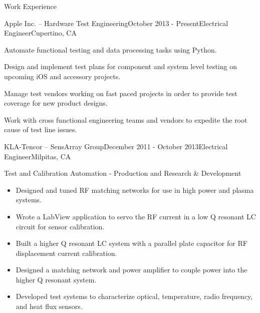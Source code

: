 \documentclass{resume} %
\begin{document}
\begin{rSection}{Work Experience}
\vspace{-0.5em}
\begin{rSubsection}{Apple Inc. -- Hardware Test Engineering}{October 2013 - Present}{Electrical Engineer}{Cupertino, CA}
\item Automate functional testing and data processing tasks using Python.
\item Design and implement test plans for component and system level testing on upcoming iOS and accessory projects.
\item Manage test vendors working on fast paced projects in order to provide test coverage for new product designs.
\item Work with cross functional engineering teams and vendors to expedite the root cause of test line issues.
\end{rSubsection}


\ssquish
\begin{rSubsection2}{KLA-Tencor -- SensArray Group}{December 2011 - October 2013}{Electrical Engineer}{Milpitas, CA}
\item Test and Calibration Automation - Production and Research \& Development
\begin{itemize}
\itemsep -0.5em \vspace{-0.5em}
\renewcommand{\labelitemi}{-}
\item Designed and tuned RF matching networks for use in high power and plasma systems.
\item Wrote a LabView application to servo the RF current in a low Q resonant LC circuit for sensor calibration.
\item Built a higher Q resonant LC system with a parallel plate capacitor for RF displacement current calibration.
\item Designed a matching network and power amplifier to couple power into the higher Q resonant system.
\item Developed test systems to characterize optical, temperature, radio frequency, and heat flux sensors.
\end{itemize}


\end{rSubsection2}
\end{rSection}
\end{document}
